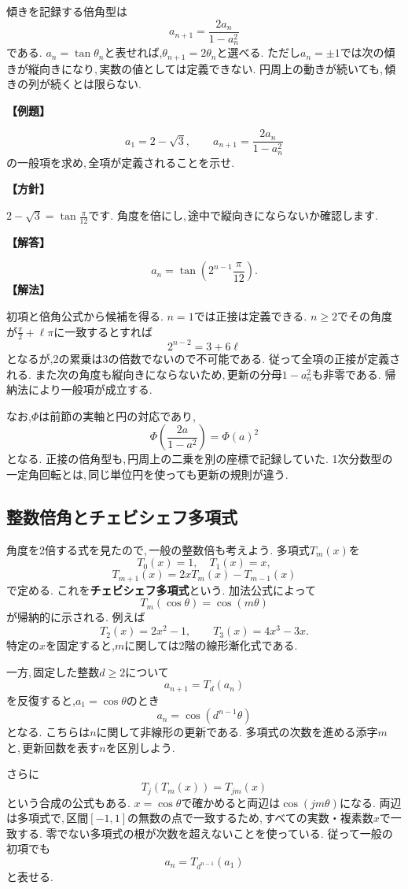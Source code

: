傾きを記録する倍角型は
\[
 a_{n+1}=\frac{2a_n}{1-a_n^2}
\]
である.
$a_n=\tan\theta_n$と表せれば,$\theta_{n+1}=2\theta_n$と選べる.
ただし$a_n=\pm1$では次の傾きが縦向きになり,\,実数の値としては定義できない.
円周上の動きが続いても,\,傾きの列が続くとは限らない.

\noindent\textbf{【例題】}\par\nobreak
\[
 a_1=2-\sqrt3,\qquad
 a_{n+1}=\frac{2a_n}{1-a_n^2}
\]
の一般項を求め,\,全項が定義されることを示せ.

\noindent\textbf{【方針】}\par\nobreak
$2-\sqrt3=\tan\frac{\pi}{12}$です. 角度を倍にし,\,途中で縦向きにならないか確認します.

\noindent\textbf{【解答】}\par\nobreak
\[
 a_n=\tan\left(2^{n-1}\frac{\pi}{12}\right).
\]
\noindent\textbf{【解法】}\par\nobreak
初項と倍角公式から候補を得る.
$n=1$では正接は定義できる.
$n\ge2$でその角度が$\frac{\pi}{2}+\ell\pi$に一致するとすれば
\[
 2^{n-2}=3+6\ell
\]
となるが,2の累乗は3の倍数でないので不可能である.
従って全項の正接が定義される.
また次の角度も縦向きにならないため,\,更新の分母$1-a_n^2$も非零である.
帰納法により一般項が成立する.

なお,$\Phi$は前節の実軸と円の対応であり,
\[
 \Phi\left(\frac{2a}{1-a^2}\right)=\Phi(a)^2
\]
となる.
正接の倍角型も,\,円周上の二乗を別の座標で記録していた.
1次分数型の一定角回転とは,\,同じ単位円を使っても更新の規則が違う.

\subsection{整数倍角とチェビシェフ多項式}

角度を2倍する式を見たので,\,一般の整数倍も考えよう.
多項式$T_m(x)$を
\[
 T_0(x)=1,\quad T_1(x)=x,
\]
\[
 T_{m+1}(x)=2xT_m(x)-T_{m-1}(x)
\]
で定める. これを\textbf{チェビシェフ多項式}という.
加法公式によって
\[
 T_m(\cos\theta)=\cos(m\theta)
\]
が帰納的に示される.
例えば
\[
 T_2(x)=2x^2-1,\qquad T_3(x)=4x^3-3x.
\]
特定の$x$を固定すると,$m$に関しては2階の線形漸化式である.

一方,\,固定した整数$d\ge2$について
\[
 a_{n+1}=T_d(a_n)
\]
を反復すると,$a_1=\cos\theta$のとき
\[
 a_n=\cos(d^{n-1}\theta)
\]
となる. こちらは$n$に関して非線形の更新である.
多項式の次数を進める添字$m$と,\,更新回数を表す$n$を区別しよう.

さらに
\[
 T_j(T_m(x))=T_{jm}(x)
\]
という合成の公式もある.
$x=\cos\theta$で確かめると両辺は$\cos(jm\theta)$になる.
両辺は多項式で,\,区間$[-1,1]$の無数の点で一致するため,\,すべての実数・複素数$x$で一致する.
零でない多項式の根が次数を超えないことを使っている.
従って一般の初項でも
\[
 a_n=T_{d^{n-1}}(a_1)
\]
と表せる.

